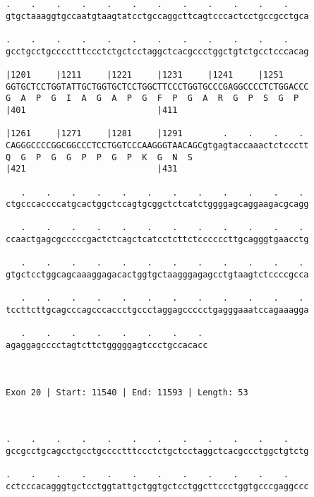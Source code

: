 \documentclass{article}
\begin{document}
\begin{Verbatim}
.    .    .    .    .    .    .    .    .    .    .    .    
gtgctaaaggtgccaatgtaagtatcctgccaggcttcagtcccactcctgccgcctgca
                                                            
.    .    .    .    .    .    .    .    .    .    .    .    
gcctgcctgcccctttccctctgctcctaggctcacgccctggctgtctgcctcccacag
                                                            
|1201     |1211     |1221     |1231     |1241     |1251     
GGTGCTCCTGGTATTGCTGGTGCTCCTGGCTTCCCTGGTGCCCGAGGCCCCTCTGGACCC
G  A  P  G  I  A  G  A  P  G  F  P  G  A  R  G  P  S  G  P  
|401                          |411                          
  
|1261     |1271     |1281     |1291        .    .    .    . 
CAGGGCCCCGGCGGCCCTCCTGGTCCCAAGGGTAACAGCgtgagtaccaaactctccctt
Q  G  P  G  G  P  P  G  P  K  G  N  S                       
|421                          |431                          
  
   .    .    .    .    .    .    .    .    .    .    .    . 
ctgcccaccccatgcactggctccagtgcggctctcatctggggagcaggaagacgcagg
                                                            
   .    .    .    .    .    .    .    .    .    .    .    . 
ccaactgagcgcccccgactctcagctcatcctcttctccccccttgcagggtgaacctg
                                                            
   .    .    .    .    .    .    .    .    .    .    .    . 
gtgctcctggcagcaaaggagacactggtgctaagggagagcctgtaagtctccccgcca
                                                            
   .    .    .    .    .    .    .    .    .    .    .    . 
tccttcttgcagcccagcccaccctgccctaggagccccctgagggaaatccagaaagga
                                                            
   .    .    .    .    .    .    .    . 
agaggagcccctagtcttctgggggagtccctgccacacc
                                        
                                        
 
Exon 20 | Start: 11540 | End: 11593 | Length: 53



.    .    .    .    .    .    .    .    .    .    .    .    
gccgcctgcagcctgcctgcccctttccctctgctcctaggctcacgccctggctgtctg
                                                            
.    .    .    .    .    .    .    .    .    .    .    .    
cctcccacagggtgctcctggtattgctggtgctcctggcttccctggtgcccgaggccc
                                                            

\end{Verbatim}
\end{document}
